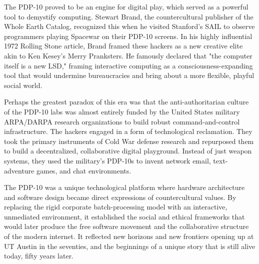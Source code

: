 The PDP-10 proved to be an engine for digital play, which served as a powerful tool to demystify computing. Stewart Brand, the countercultural publisher of the Whole Earth Catalog, recognized this when he visited Stanford's SAIL to observe programmers playing Spacewar on their PDP-10 screens. In his highly influential 1972 Rolling Stone article, Brand framed these hackers as a new creative elite akin to Ken Kesey's Merry Pranksters. He famously declared that "the computer itself is a new LSD," framing interactive computing as a consciousness-expanding tool that would undermine bureaucracies and bring about a more flexible, playful social world.

Perhaps the greatest paradox of this era was that the anti-authoritarian culture of the PDP-10 labs was almost entirely funded by the United States military ARPA/DARPA research organizations to build robust command-and-control infrastructure. The hackers engaged in a form of technological reclamation. They took the primary instruments of Cold War defense research and repurposed them to build a decentralized, collaborative digital playground. Instead of just weapon systems, they used the military's PDP-10s to invent network email, text-adventure games, and chat environments.

The PDP-10 was a unique technological platform where hardware architecture and software design became direct expressions of countercultural values. By replacing the rigid corporate batch-processing model with an interactive, unmediated environment, it established the social and ethical frameworks that would later produce the free software movement and the collaborative structure of the modern internet. It reflected new horizons and new frontiers opening up at UT Austin in the seventies, and the beginnings of a unique story that is still alive today, fifty years later.
